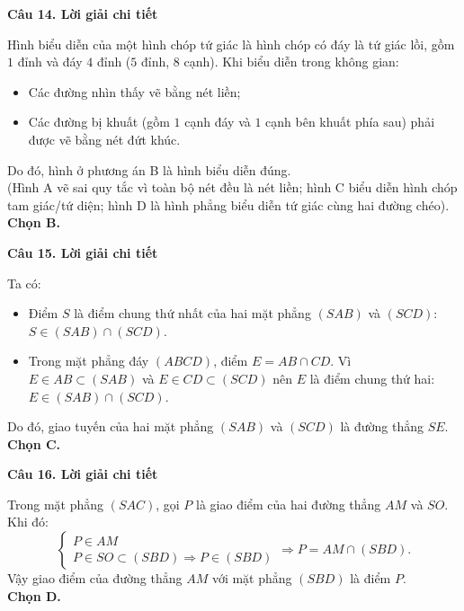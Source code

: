 \documentclass[12pt, a4paper]{article}
\begin{document}
\noindent\textbf{Câu 14. Lời giải chi tiết}\par
\begin{tcolorbox}[enhanced,breakable,colback=solutionbg,colframe=secondary!50!black,frame hidden,borderline west={3pt}{0pt}{secondary!50!black}]
Hình biểu diễn của một hình chóp tứ giác là hình chóp có đáy là tứ giác lồi, gồm $1$ đỉnh và đáy $4$ đỉnh ($5$ đỉnh, $8$ cạnh). Khi biểu diễn trong không gian:
\begin{itemize}[leftmargin=1.5em]
\item Các đường nhìn thấy vẽ bằng nét liền;
\item Các đường bị khuất (gồm $1$ cạnh đáy và $1$ cạnh bên khuất phía sau) phải được vẽ bằng nét đứt khúc.
\end{itemize}
Do đó, hình ở phương án B là hình biểu diễn đúng.\\
(Hình A vẽ sai quy tắc vì toàn bộ nét đều là nét liền; hình C biểu diễn hình chóp tam giác/tứ diện; hình D là hình phẳng biểu diễn tứ giác cùng hai đường chéo).\\
\textbf{Chọn B.}
\end{tcolorbox}

\noindent\textbf{Câu 15. Lời giải chi tiết}\par
\begin{tcolorbox}[enhanced,breakable,colback=solutionbg,colframe=secondary!50!black,frame hidden,borderline west={3pt}{0pt}{secondary!50!black}]
Ta có:
\begin{itemize}[leftmargin=1.5em]
\item Điểm $S$ là điểm chung thứ nhất của hai mặt phẳng $(SAB)$ và $(SCD)$: $S \in (SAB) \cap (SCD)$.
\item Trong mặt phẳng đáy $(ABCD)$, điểm $E = AB \cap CD$. Vì $E \in AB \subset (SAB)$ và $E \in CD \subset (SCD)$ nên $E$ là điểm chung thứ hai: $E \in (SAB) \cap (SCD)$.
\end{itemize}
Do đó, giao tuyến của hai mặt phẳng $(SAB)$ và $(SCD)$ là đường thẳng $SE$.\\
\textbf{Chọn C.}
\end{tcolorbox}

\noindent\textbf{Câu 16. Lời giải chi tiết}\par
\begin{tcolorbox}[enhanced,breakable,colback=solutionbg,colframe=secondary!50!black,frame hidden,borderline west={3pt}{0pt}{secondary!50!black}]
Trong mặt phẳng $(SAC)$, gọi $P$ là giao điểm của hai đường thẳng $AM$ và $SO$. Khi đó:
$$\begin{cases} P \in AM \\ P \in SO \subset (SBD) \Rightarrow P \in (SBD) \end{cases} \Rightarrow P = AM \cap (SBD).$$
Vậy giao điểm của đường thẳng $AM$ với mặt phẳng $(SBD)$ là điểm $P$.\\
\textbf{Chọn D.}
\end{tcolorbox}
\end{document}
